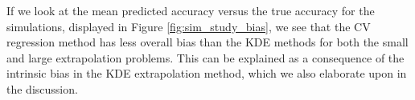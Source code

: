 \documentclass[twoside,11pt]{article}
\begin{document}
If we look at the mean predicted accuracy versus the true accuracy for
the simulations, displayed in Figure \ref{fig:sim_study_bias}, we see
that the CV regression method has less overall bias than the KDE
methods for both the small and large extrapolation problems.  This can
be explained as a consequence of the intrinsic bias in the KDE
extrapolation method, which we also elaborate upon in the discussion.


\end{document}
